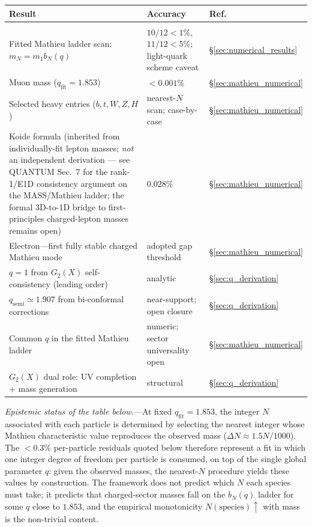 \documentclass[11pt]{article}
\begin{document}
\begin{center}
\renewcommand{\arraystretch}{1.3}
\begin{tabular}{@{}p{6cm}ll@{}}
\textbf{Result} & \textbf{Accuracy} & \textbf{Ref.}
  \\[2pt]\hline\\[-6pt]
Fitted Mathieu ladder scan: $m_N = m_1 b_N(q)$
  & $10/12<1\%$, $11/12<5\%$; light-quark scheme caveat
  & \S\ref{sec:numerical_results} \\
Muon mass ($q_{\mathrm{fit}} = 1.853$)
  & $< 0.001\%$ & \S\ref{sec:mathieu_numerical} \\
Selected heavy entries ($b,t,W,Z,H$)
  & nearest-$N$ scan; case-by-case & \S\ref{sec:mathieu_numerical} \\
Koide formula (inherited from individually-fit lepton masses;
\emph{not} an independent derivation --- see QUANTUM Sec.~7 for
the rank-1/E1D consistency argument on the MASS/Mathieu
ladder; the formal 3D-to-1D bridge to first-principles
charged-lepton masses remains open)
  & $0.028\%$ & \S\ref{sec:mathieu_numerical} \\
Electron---first fully stable charged Mathieu mode
  & adopted gap threshold & \S\ref{sec:mathieu_numerical} \\
$q = 1$ from $G_2(X)$ self-consistency (leading order)
  & analytic & \S\ref{sec:q_derivation} \\
$q_{\mathrm{semi}}\simeq 1.907$ from bi-conformal corrections
  & near-support; open closure & \S\ref{sec:q_derivation} \\
Common $q$ in the fitted Mathieu ladder
  & numeric; sector universality open & \S\ref{sec:mathieu_numerical} \\
$G_2(X)$ dual role: UV completion + mass generation
  & structural & \S\ref{sec:q_derivation} \\
\end{tabular}
\end{center}

\textit{Epistemic status of the table below.}---At fixed
$q_{\mathrm{fit}} = 1.853$, the integer $N$ associated with each particle
is determined by selecting the nearest integer whose
Mathieu characteristic value reproduces the observed mass
($\Delta N \approx 1.5N/1000$).  The $<\!0.3\%$ per-particle
residuals quoted below therefore represent a fit in which
one integer degree of freedom per particle is consumed, on
top of the single global parameter $q$: given the observed
masses, the nearest-$N$ procedure yields these values by
construction.  The framework does not predict which $N$
each species must take; it predicts that charged-sector
masses fall on the $b_N(q)$ ladder for some $q$ close to
$1.853$, and the empirical monotonicity $N(\text{species})
\uparrow$ with mass is the non-trivial content.
\end{document}
